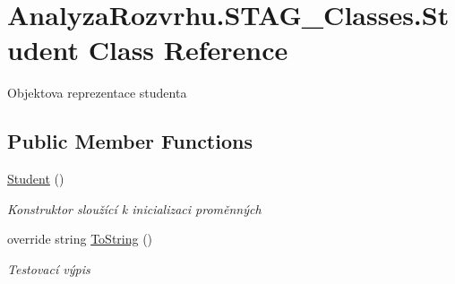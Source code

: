 \hypertarget{class_analyza_rozvrhu_1_1_s_t_a_g___classes_1_1_student}{}\section{Analyza\+Rozvrhu.\+S\+T\+A\+G\+\_\+\+Classes.\+Student Class Reference}
\label{class_analyza_rozvrhu_1_1_s_t_a_g___classes_1_1_student}


Objektova reprezentace studenta  


\subsection*{Public Member Functions}
\begin{DoxyCompactItemize}
\item 
\hyperlink{class_analyza_rozvrhu_1_1_s_t_a_g___classes_1_1_student_a1985851950a0f645404ac517bb57127e}{Student} ()
\begin{DoxyCompactList}\small\item\em Konstruktor sloužící k inicializaci proměnných \end{DoxyCompactList}\item 
override string \hyperlink{class_analyza_rozvrhu_1_1_s_t_a_g___classes_1_1_student_a5d5862aaeaf12e7cf50ab32192e8ab24}{To\+String} ()
\begin{DoxyCompactList}\small\item\em Testovací výpis \end{DoxyCompactList}\end{DoxyCompactItemize}
